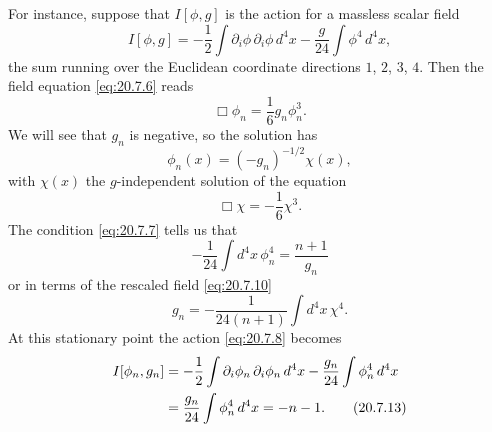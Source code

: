 For instance, suppose that $I[\phi,g]$ is the action for a massless scalar field
\begin{equation}
I[\phi,g]
=-\frac12\int \partial_i\phi\,\partial_i\phi\,d^4x
-\frac{g}{24}\int\phi^4\,d^4x,
\tag{20.7.8}\label{eq:20.7.8}
\end{equation}
the sum running over the Euclidean coordinate directions $1$, $2$, $3$, $4$. Then the field equation \eqref{eq:20.7.6} reads
\begin{equation}
\Box\phi_n=\frac16g_n\phi_n^3.
\tag{20.7.9}\label{eq:20.7.9}
\end{equation}
We will see that $g_n$ is negative, so the solution has
\begin{equation}
\phi_n(x)=(-g_n)^{-1/2}\chi(x),
\tag{20.7.10}\label{eq:20.7.10}
\end{equation}
with $\chi(x)$ the $g$-independent solution of the equation
\begin{equation}
\Box\chi=-\frac16\chi^3.
\tag{20.7.11}\label{eq:20.7.11}
\end{equation}
The condition \eqref{eq:20.7.7} tells us that
\[
-\frac1{24}\int d^4x\,\phi_n^4=\frac{n+1}{g_n}
\]
or in terms of the rescaled field \eqref{eq:20.7.10}
\begin{equation}
g_n=-\frac{1}{24(n+1)}\int d^4x\,\chi^4.
\tag{20.7.12}\label{eq:20.7.12}
\end{equation}
At this stationary point the action \eqref{eq:20.7.8} becomes
\begin{align}
I[\phi_n,g_n]
&=-\frac12\int\partial_i\phi_n\,\partial_i\phi_n\,d^4x
-\frac{g_n}{24}\int\phi_n^4\,d^4x
\notag\\
&=\frac{g_n}{24}\int\phi_n^4\,d^4x
=-n-1.
\tag{20.7.13}\label{eq:20.7.13}
\end{align}

